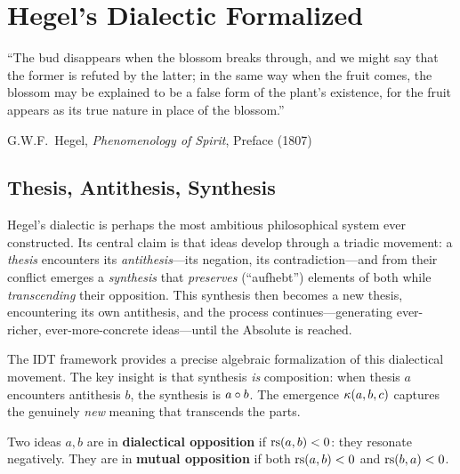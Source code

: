 

\chapter{Hegel's Dialectic Formalized}
\label{ch:hegel}

\epigraph{``The bud disappears when the blossom breaks through, and we might
say that the former is refuted by the latter; in the same way when the fruit
comes, the blossom may be explained to be a false form of the plant's existence,
for the fruit appears as its true nature in place of the blossom.''}{G.W.F.\ Hegel, \textit{Phenomenology of Spirit}, Preface (1807)}

\section{Thesis, Antithesis, Synthesis}

Hegel's dialectic is perhaps the most ambitious philosophical system ever
constructed. Its central claim is that ideas develop through a triadic movement:
a \emph{thesis} encounters its \emph{antithesis}---its negation, its
contradiction---and from their conflict emerges a \emph{synthesis} that
\emph{preserves} (``aufhebt'') elements of both while \emph{transcending} their
opposition. This synthesis then becomes a new thesis, encountering its own
antithesis, and the process continues---generating ever-richer, ever-more-concrete
ideas---until the Absolute is reached.

The IDT framework provides a precise algebraic formalization of this dialectical
movement. The key insight is that synthesis \emph{is} composition: when thesis
$a$ encounters antithesis $b$, the synthesis is $a \circ b$. The emergence
$\kappa(a, b, c)$ captures the genuinely \emph{new} meaning that transcends
the parts.

\begin{definition}
\label{def:opposition}
Two ideas $a, b$ are in \textbf{dialectical opposition} if $\mathrm{rs}(a, b) < 0$:
they resonate negatively. They are in \textbf{mutual opposition} if both
$\mathrm{rs}(a,b) < 0$ and $\mathrm{rs}(b,a) < 0$.
\end{definition}

